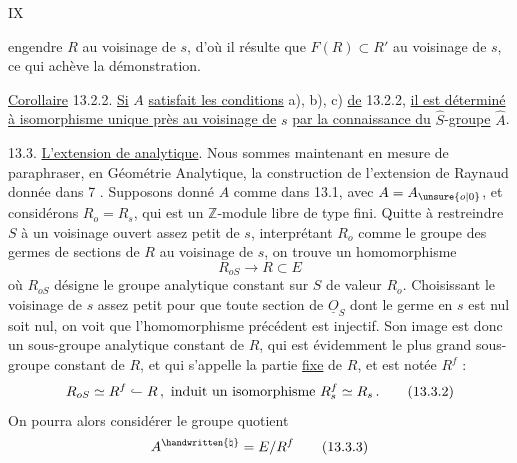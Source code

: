 \hfill IX

engendre $R$ au voisinage de $s$, d'où il résulte que $F(R)\subset R'$ au voisinage de $s$, ce qui achève la démonstration.

\uline{Corollaire} 13.2.2. \uline{Si} $A$ \uline{satisfait les conditions} a), b), c) \uline{de} 13.2.2, \uline{il est déterminé à isomorphisme unique près au voisinage de} $s$ \uline{par la connaissance du} $\hat S$-\uline{groupe} $\hat A$.

13.3. \uline{L'extension de  analytique}. Nous sommes maintenant en mesure de paraphraser, en Géométrie Analytique, la construction de l'extension de Raynaud donnée dans 7 . Supposons donné $A$ comme dans 13.1, avec $A=A_{\unsure{o|0}}$, et considérons $R_o=R_s$, qui est un $\mathbb Z$-module libre de type fini. Quitte à restreindre $S$ à un voisinage ouvert assez petit de $s$, interprétant $R_o$ comme le groupe des germes de sections de $R$ au voisinage de $s$, on trouve un homomorphisme
\[
 R_{oS}\longrightarrow R\subset E \tag*{(13.3.1)}
\]
où $R_{oS}$ désigne le groupe analytique constant sur $S$ de valeur $R_o$. Choisissant le voisinage de $s$ assez petit pour que toute section de $\underline O_S$ dont le germe en $s$ est nul soit nul, on voit que l'homomorphisme précédent est injectif. Son image est donc un sous-groupe analytique constant de $R$, qui est évidemment le plus grand sous-groupe constant de $R$, et qui s'appelle la partie \uline{fixe} de $R$, et est notée $R^f$ :
\[
 R_{oS}\simeq R^f\lhook\joinrel\relbar R\,,\ \text{induit un isomorphisme } R^f_s\simeq R_s\,.
 \tag*{(13.3.2)}
\]
On pourra alors considérer le groupe quotient
\[
 A^{\handwritten{\natural}}=E/R^f\tag*{(13.3.3)}
\]
